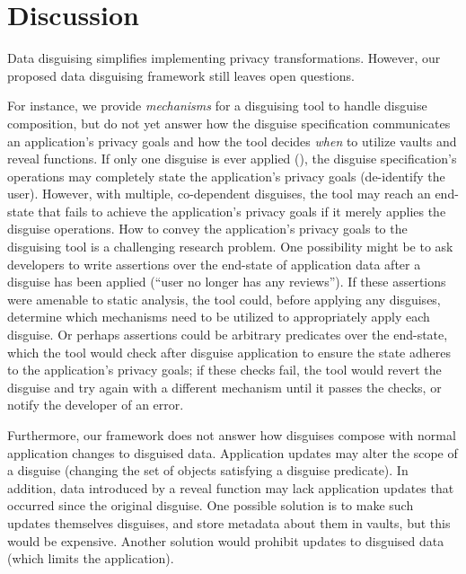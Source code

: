 \section{Discussion}
\label{s:disc}
%
Data disguising simplifies implementing privacy transformations.
%
However, our proposed data disguising framework still leaves open questions.
%

%
For instance, we provide \emph{mechanisms} for a disguising tool
to handle disguise composition, but do not yet answer how the disguise specification
communicates an application's privacy goals and how the tool decides \emph{when} to
utilize vaults and reveal functions.
%
%
If only one disguise is ever applied (\eg \gdpr), the disguise specification's operations
may completely state the application's privacy goals (\eg de-identify the user).
%
However, with multiple, co-dependent disguises, the tool may reach an end-state that
fails to achieve the application's privacy goals if it merely applies the disguise
operations.
%
How to convey the application's privacy goals to the disguising tool is a challenging
research problem.
%
One possibility might be to ask developers to write assertions over the end-state of
application data after a disguise has been applied (\eg ``user no longer has any reviews'').
%
If these assertions were amenable to static analysis, the tool could, before applying any
disguises, determine which mechanisms need to be utilized to appropriately apply each
disguise.
%
Or perhaps assertions could be arbitrary predicates over the end-state, which the
tool would check after disguise application to ensure the state adheres to the
application's privacy goals; if these checks fail, the tool would revert the disguise
and try again with a different mechanism until it passes the checks, or notify the developer
of an error.
%

%
Furthermore, our framework does not answer how disguises compose with normal application
changes to disguised data.
%
Application updates may alter the scope of a disguise (\ie changing the set of
objects satisfying a disguise predicate).
%
In addition, data introduced by a reveal function may lack application updates that
occurred since the original disguise.
%
One possible solution is to make such updates themselves disguises, and store metadata
about them in vaults, but this would be expensive.
%
Another solution would prohibit updates to disguised data (which limits the application).
%

